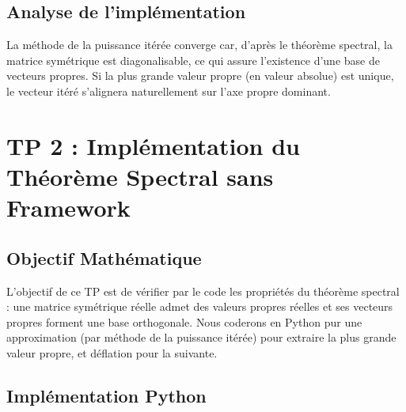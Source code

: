 \documentclass[11pt,a4paper]{article}
\begin{document}
\subsection{Analyse de l'implémentation}
La méthode de la puissance itérée converge car, d'après le théorème spectral, la matrice symétrique est diagonalisable, ce qui assure l'existence d'une base de vecteurs propres. Si la plus grande valeur propre (en valeur absolue) est unique, le vecteur itéré s'alignera naturellement sur l'axe propre dominant.

\newpage
\section{TP 2 : Implémentation du Théorème Spectral sans Framework}

\subsection{Objectif Mathématique}
L'objectif de ce TP est de vérifier par le code les propriétés du théorème spectral : une matrice symétrique réelle admet des valeurs propres réelles et ses vecteurs propres forment une base orthogonale. Nous coderons en Python pur une approximation (par méthode de la puissance itérée) pour extraire la plus grande valeur propre, et déflation pour la suivante.

\subsection{Implémentation Python}
\end{document}
